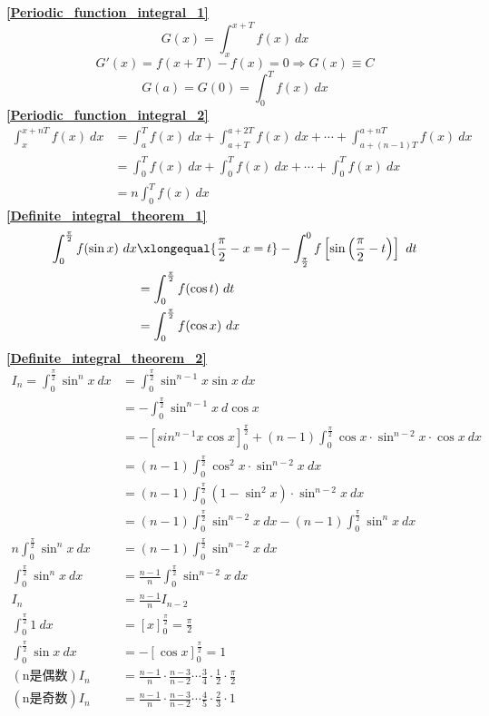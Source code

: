 \textbf{\large \ref{Periodic_function_integral_1}}
	$$G(x)=\int_{x}^{x+T}f(x)\ dx$$
	$$G'(x)=f(x+T)-f(x)=0\Rightarrow G(x)\equiv C$$
	$$G(a)=G(0)=\int_{0}^{T}f(x)\ dx$$
\textbf{\large \ref{Periodic_function_integral_2}}
\begin{align*}
	\int_{x}^{x+nT}f(x)\ dx&=\int_{a}^{T}f(x)\ dx+\int_{a+T}^{a+2T}f(x)\ dx+\cdots+\int_{a+(n-1)T}^{a+nT}f(x)\ dx\\
	&=\int_{0}^{T}f(x)\ dx+\int_{0}^{T}f(x)\ dx+\cdots+\int_{0}^{T}f(x)\ dx\\
	&=n\int_{0}^{T}f(x)\ dx
\end{align*}
\textbf{\large \ref{Definite_integral_theorem_1}}
\begin{align*}
	\int_{0}^{\frac{\pi}{2}}f(\sin x)\ dx&\xlongequal{\frac{\pi}{2}-x=t}-\int_{\frac{\pi}{2}}^{0}f\left[\sin \left(\frac{\pi}{2}-t\right)\right]\ dt\\
	&=\int_{0}^{\frac{\pi}{2}}f(\cos t)\ dt\\
	&=\int_{0}^{\frac{\pi}{2}}f(\cos x)\ dx
\end{align*}
\textbf{\large \ref{Definite_integral_theorem_2}}
\begin{align*}
	I_n=\int_{0}^{\frac{\pi}{2}}\sin^n x\ dx&=\int_{0}^{\frac{\pi}{2}}\sin^{n-1} x\sin x\ dx\\
	&=-\int_{0}^{\frac{\pi}{2}}\sin^{n-1} x\ d\cos x\\
	&=-\left[sin^{n-1}x\cos x\right]_0^{\frac{\pi}{2}}+(n-1)\int_{0}^{\frac{\pi}{2}}\cos x\cdot\sin^{n-2}x\cdot\cos x\ dx\\
	&=(n-1)\int_{0}^{\frac{\pi}{2}}\cos^2 x\cdot\sin^{n-2}x\ dx\\
	&=(n-1)\int_{0}^{\frac{\pi}{2}}(1-\sin^2x)\cdot\sin^{n-2}x\ dx\\
	&=(n-1)\int_{0}^{\frac{\pi}{2}}\sin^{n-2}x\ dx-(n-1)\int_{0}^{\frac{\pi}{2}}\sin^nx\ dx\\
	n\int_{0}^{\frac{\pi}{2}}\sin^nx\ dx&=(n-1)\int_{0}^{\frac{\pi}{2}}\sin^{n-2}x\ dx\\
	\int_{0}^{\frac{\pi}{2}}\sin^nx\ dx&=\frac{n-1}{n}\int_{0}^{\frac{\pi}{2}}\sin^{n-2}x\ dx\\
	I_n&=\frac{n-1}{n}I_{n-2}\\
	\int_{0}^{\frac{\pi}{2}}1\ dx&=\left[x\right]_0^{\frac{\pi}{2}}=\frac{\pi}{2}\\
	\int_{0}^{\frac{\pi}{2}}\sin x\ dx&=-\left[\cos x\right]_0^{\frac{\pi}{2}}=1\\
	(\mbox{n是偶数})I_n&=\frac{n-1}{n}\cdot\frac{n-3}{n-2}\cdots\frac{3}{4}\cdot\frac{1}{2}\cdot\frac{\pi}{2}\\
	(\mbox{n是奇数})I_n&=\frac{n-1}{n}\cdot\frac{n-3}{n-2}\cdots\frac{4}{5}\cdot\frac{2}{3}\cdot 1
\end{align*}
